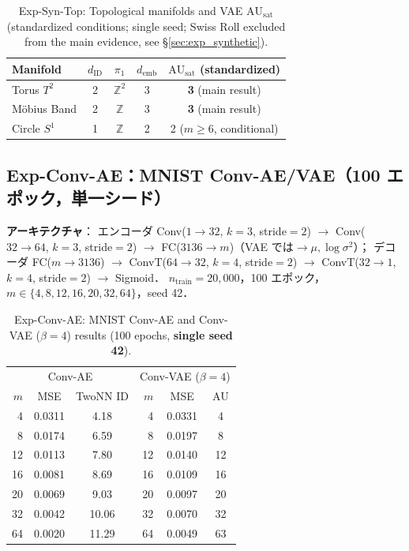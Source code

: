 \documentclass[11pt,a4paper]{jsarticle}
\newcommand{\dID}{d_{\mathrm{ID}}}
\newcommand{\AUsat}{\mathrm{AU}_{\mathrm{sat}}}
\newcommand{\demb}{d_{\mathrm{emb}}}
\begin{document}
\begin{table}[H]
\centering
\caption{Exp-Syn-Top: Topological manifolds and VAE $\AUsat$ (standardized conditions; single seed; Swiss Roll excluded from the main evidence, see §\ref{sec:exp_synthetic}).}
\label{tab:eb_summary}
\small
\begin{tabular}{lcccc}
\toprule
Manifold & $\dID$ & $\pi_1$ & $\demb$ & $\AUsat$ (standardized) \\
\midrule
Torus $T^2$  & 2 & $\mathbb{Z}^2$ & 3 & \textbf{3} (main result) \\
Möbius Band  & 2 & $\mathbb{Z}$   & 3 & \textbf{3} (main result) \\
Circle $S^1$ & 1 & $\mathbb{Z}$   & 2 & 2 ($m \geq 6$, conditional) \\
\bottomrule
\end{tabular}
\end{table}

\subsection*{Exp-Conv-AE：MNIST Conv-AE/VAE（100 エポック，単一シード）}

\textbf{アーキテクチャ}：
エンコーダ Conv($1\to32$, $k=3$, stride$=2$) $\to$ Conv($32\to64$, $k=3$, stride$=2$)
$\to$ FC($3136\to m$)（VAE では$\to \mu, \log\sigma^2$）；
デコーダ FC($m\to3136$) $\to$ ConvT($64\to32$, $k=4$, stride$=2$) $\to$
ConvT($32\to1$, $k=4$, stride$=2$) $\to$ Sigmoid．
$n_{\mathrm{train}} = 20{,}000$，100 エポック，$m \in \{4, 8, 12, 16, 20, 32, 64\}$，seed 42．

\begin{table}[H]
\centering
\caption{Exp-Conv-AE: MNIST Conv-AE and Conv-VAE ($\beta=4$) results (100 epochs, \textbf{single seed 42}).}
\label{tab:eg}
\small
\begin{tabular}{rcc|rcc}
\toprule
\multicolumn{3}{c|}{Conv-AE} & \multicolumn{3}{c}{Conv-VAE ($\beta=4$)} \\
$m$ & MSE & TwoNN ID & $m$ & MSE & AU \\
\midrule
 4  & 0.0311 & 4.18  &  4  & 0.0331 &  4 \\
 8  & 0.0174 & 6.59  &  8  & 0.0197 &  8 \\
12  & 0.0113 & 7.80  & 12  & 0.0140 & 12 \\
16  & 0.0081 & 8.69  & 16  & 0.0109 & 16 \\
20  & 0.0069 & 9.03  & 20  & 0.0097 & 20 \\
32  & 0.0042 & 10.06 & 32  & 0.0070 & 32 \\
64  & 0.0020 & 11.29 & 64  & 0.0049 & 63 \\
\bottomrule
\end{tabular}
\end{table}
\end{document}
